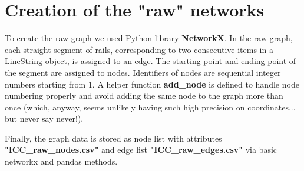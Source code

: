 \section{Creation of the "raw" networks}
To create the raw graph we used Python library \textbf{NetworkX}. 
In the raw graph, each straight segment of rails, corresponding to two consecutive items in a LineString object, is assigned to an edge. The starting point and ending point of the segment are assigned to nodes. Identifiers of nodes are sequential integer numbers starting from $1$. A helper function \textbf{add\_node} is defined to handle node numbering properly and avoid adding the same node to the graph more than once (which, anyway, seems unlikely having such high precision on coordinates... but never say never!).

Finally, the graph data is stored as node list with attributes \textbf{"{ICC}\_raw\_nodes.csv"} and edge list \textbf{"{ICC}\_raw\_edges.csv"}
via basic networkx and pandas methods.


